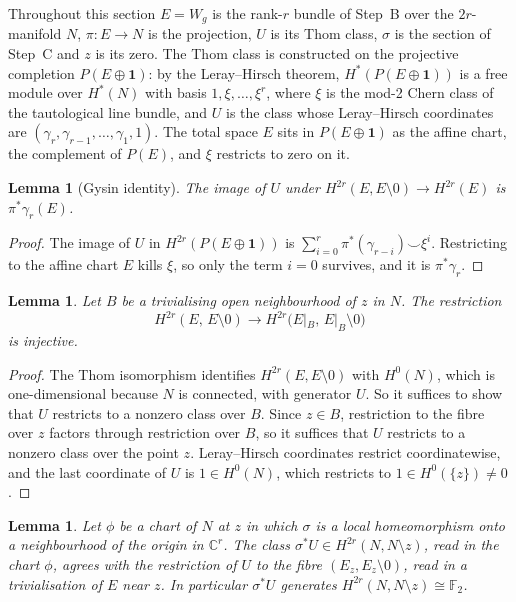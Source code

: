 \documentclass[11pt]{amsart}
\newcommand{\leanverified}[2]{\ignorespaces}
\newtheorem{lemma}[theorem]{Lemma}
\theoremstyle{plain}
\theoremstyle{definition}
\newcommand{\F}{\mathbb F}
\newcommand{\C}{\mathbb C}
\begin{document}
Throughout this section $E = W_g$ is the rank-$r$ bundle of Step~B over the
$2r$-manifold $N$, $\pi \colon E \to N$ is the projection, $U$ is its Thom
class, $\sigma$ is the section of Step~C and $z$ is its zero.  The Thom class
is constructed on the projective completion $P(E \oplus \mathbf 1)$: by the
Leray--Hirsch theorem, $H^{*}(P(E \oplus \mathbf 1))$ is a free module over
$H^{*}(N)$ with basis $1, \xi, \dots, \xi^{r}$, where $\xi$ is the mod-2 Chern
class of the tautological line bundle, and $U$ is the class whose
Leray--Hirsch coordinates are $(\gamma_r, \gamma_{r-1}, \dots, \gamma_1, 1)$.
The total space $E$ sits in $P(E \oplus \mathbf 1)$ as the affine chart, the
complement of $P(E)$, and $\xi$ restricts to zero on it.

\begin{lemma}[Gysin identity]
\label{lem:hclass}
The image of $U$ under $H^{2r}(E, E \setminus 0) \to H^{2r}(E)$ is
$\pi^{*}\gamma_r(E)$.
\leanverified{sec:hclass}{GroupApproximation.CharClass.lixHclass}
\end{lemma}

\begin{proof}
The image of $U$ in $H^{2r}(P(E \oplus \mathbf 1))$ is
$\sum_{i=0}^{r} \pi^{*}(\gamma_{r-i}) \smile \xi^{i}$.  Restricting to the
affine chart $E$ kills $\xi$, so only the term $i = 0$ survives, and it is
$\pi^{*}\gamma_r$.
\end{proof}

\begin{lemma}
\label{lem:hres}
Let $B$ be a trivialising open neighbourhood of $z$ in $N$.  The restriction
\[
  H^{2r}(E,\,E \setminus 0) \longrightarrow
  H^{2r}\bigl(E|_B,\,E|_B \setminus 0\bigr)
\]
is injective.
\leanverified{sec:hres}{GroupApproximation.CharClass.injective\_lixRes}
\end{lemma}

\begin{proof}
The Thom isomorphism identifies $H^{2r}(E, E \setminus 0)$ with $H^0(N)$,
which is one-dimensional because $N$ is connected, with generator $U$.  So it
suffices to show that $U$ restricts to a nonzero class over $B$.  Since
$z \in B$, restriction to the fibre over $z$ factors through restriction over
$B$, so it suffices that $U$ restricts to a nonzero class over the point $z$.
Leray--Hirsch coordinates restrict coordinatewise, and the last coordinate of
$U$ is $1 \in H^0(N)$, which restricts to $1 \in H^0(\{z\}) \neq 0$.
\end{proof}

\begin{lemma}
\label{lem:hsq}
Let $\phi$ be a chart of $N$ at $z$ in which $\sigma$ is a local
homeomorphism onto a neighbourhood of the origin in $\C^r$.  The class
$\sigma^{*}U \in H^{2r}(N, N \setminus z)$, read in the chart $\phi$, agrees
with the restriction of $U$ to the fibre $(E_z, E_z \setminus 0)$, read in a
trivialisation of $E$ near $z$.  In particular $\sigma^{*}U$ generates
$H^{2r}(N, N \setminus z) \cong \F_2$.
\leanverified{sec:hsq}{GroupApproximation.CharClass.lixHsq}
\end{lemma}
\end{document}

